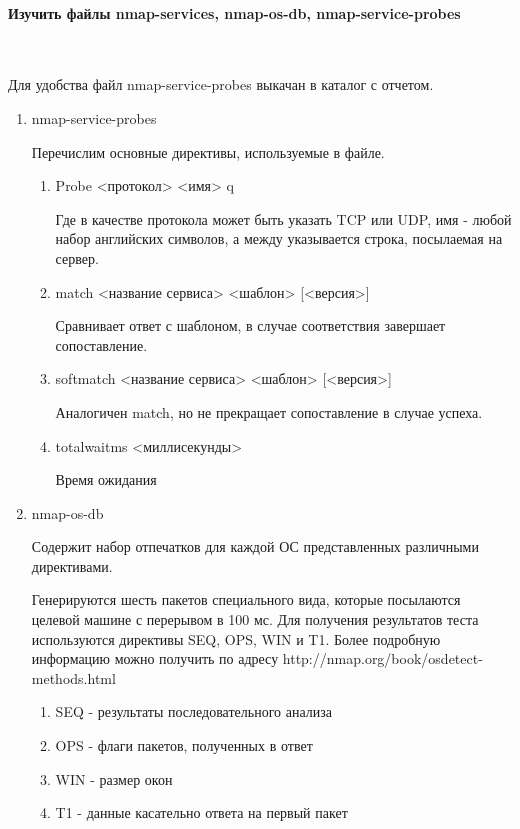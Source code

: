 \documentclass{article}
\begin{document}
\paragraph{Изучить файлы nmap-services, nmap-os-db, nmap-service-probes}
~

Для удобства файл nmap-service-probes выкачан в каталог с отчетом.

\begin{enumerate}
\item nmap-service-probes

Перечислим основные директивы, используемые в файле.

\begin{enumerate}
\item Probe <протокол> <имя> q\dq

Где в качестве протокола может быть указать TCP или UDP, имя - любой набор английских символов, а между \dq \dq указывается строка, посылаемая на сервер.

\item match <название сервиса> <шаблон> [<версия>]

Сравнивает ответ с шаблоном, в случае соответствия завершает сопоставление.

\item softmatch  <название сервиса> <шаблон> [<версия>]

Аналогичен match, но не прекращает сопоставление в случае успеха.

\item totalwaitms  <миллисекунды>

Время ожидания
\end{enumerate}

\item nmap-os-db

Содержит набор отпечатков для каждой ОС представленных различными директивами.

Генерируются шесть пакетов специального вида, которые посылаются целевой машине с перерывом в 100 мс. Для получения результатов теста используются директивы SEQ, OPS, WIN и T1. Более подробную информацию можно получить по адресу http://nmap.org/book/osdetect-methods.html

\begin{enumerate}
\item SEQ - результаты последовательного анализа
\item OPS - флаги пакетов, полученных в ответ
\item WIN - размер окон
\item T1 - данные касательно ответа на первый пакет
\end{enumerate}


\end{enumerate}
\end{document}
